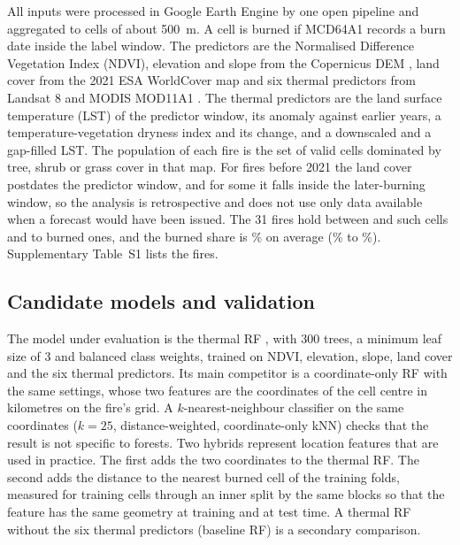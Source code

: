 \documentclass[preprint,12pt,authoryear]{elsarticle}
\begin{document}
All inputs were processed in Google Earth Engine \citep{Gorelick2017} by one open pipeline \citep{ThermalTwinRepo} and aggregated to cells of about 500~m. A cell is burned if MCD64A1 records a burn date inside the label window. The predictors are the Normalised Difference Vegetation Index (NDVI), elevation and slope from the Copernicus DEM \citep{CopernicusDEM}, land cover from the 2021 ESA WorldCover map \citep{Zanaga2022} and six thermal predictors from Landsat 8 \citep{LandsatC2L2} and MODIS MOD11A1 \citep{MOD11A1}. The thermal predictors are the land surface temperature (LST) of the predictor window, its anomaly against earlier years, a temperature-vegetation dryness index and its change, and a downscaled and a gap-filled LST. The population of each fire is the set of valid cells dominated by tree, shrub or grass cover in that map. For fires before 2021 the land cover postdates the predictor window, and for some it falls inside the later-burning window, so the analysis is retrospective and does not use only data available when a forecast would have been issued. The 31 fires hold between \vcellsMin{} and \vcellsMax{} such cells and \vburnedMin{} to \vburnedMax{} burned ones, and the burned share is \vprevMean\% on average (\vprevMin\% to \vprevMax\%). Supplementary Table~S1 lists the fires.

\subsection{Candidate models and validation}
\label{sec:models}

The model under evaluation is the thermal RF \citep{Breiman2001}, with 300 trees, a minimum leaf size of 3 and balanced class weights, trained on NDVI, elevation, slope, land cover and the six thermal predictors. Its main competitor is a coordinate-only RF with the same settings, whose two features are the coordinates of the cell centre in kilometres on the fire's grid. A $k$-nearest-neighbour classifier on the same coordinates ($k = 25$, distance-weighted, coordinate-only kNN) checks that the result is not specific to forests. Two hybrids represent location features that are used in practice. The first adds the two coordinates to the thermal RF. The second adds the distance to the nearest burned cell of the training folds, measured for training cells through an inner split by the same blocks so that the feature has the same geometry at training and at test time. A thermal RF without the six thermal predictors (baseline RF) is a secondary comparison.
\end{document}
